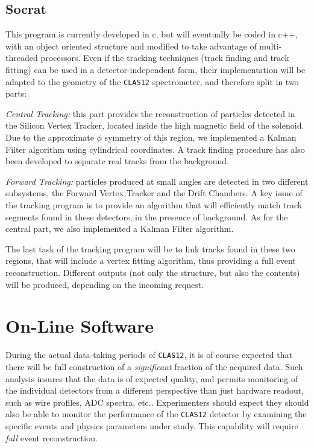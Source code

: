 \subsection{Socrat}

This program is currently developed in 
c, but will eventually be coded in c++, with an object oriented structure and modified to take advantage of multi-threaded processors. 
Even if the tracking techniques (track finding and track fitting) can be 
used in a detector-independent form, their implementation will be adapted 
to the geometry of the {\tt CLAS12} spectrometer, and therefore split in 
two parts:

\vskip 0.2cm

{\it Central Tracking:} this part provides the reconstruction of particles 
detected in the Silicon Vertex Tracker, located inside the high magnetic 
field of the solenoid. Due to the approximate $\phi$ symmetry of this 
region, we implemented a Kalman Filter algorithm using cylindrical 
coordinates. A track finding procedure has also been developed to separate 
real tracks from the background.

{\it Forward Tracking:} particles produced at small angles are detected in two 
different subsystems, the Forward Vertex Tracker and the Drift Chambers. A 
key issue of the tracking program is to provide an algorithm that will 
efficiently match track segments found in these detectors, in the presence of 
background.  As for the central part, we also implemented a Kalman Filter 
algorithm.

\vskip 0.2cm

The last task of the tracking program will be to link tracks found in these 
two regions, that will include a vertex fitting algorithm, thus providing a 
full event reconstruction.  Different outputs (not only the structure, but 
also the contents) will be produced, depending on the incoming request.



\section{On-Line Software}

During the actual data-taking periods of {\tt CLAS12}, it is of course 
expected that there will be full construction of a {\it significant} fraction 
of the acquired data.  Such analysis insures that the data is of expected 
quality, and permits monitoring of the individual detectors from a different 
perspective than just hardware readout, such as wire profiles, ADC spectra, 
etc..  Experimenters should expect they should also be able to monitor the 
performance of the {\tt CLAS12} detector by examining the specific events and 
physics parameters under study.  This capability will require {\it full} event 
reconstruction. 

